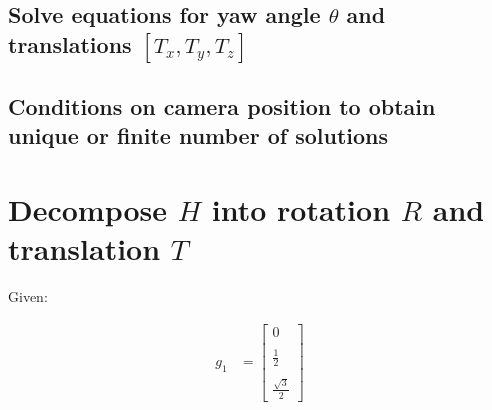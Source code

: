 \documentclass[12pt, oneside]{article}
\begin{document}
\subsection{Solve equations for yaw angle $\theta$ and translations 
$[T_x, T_y, T_z]$}

\subsection{Conditions on camera position to obtain unique or finite number 
of solutions}

\clearpage
\section{Decompose $H$ into rotation $R$ and translation $T$}

Given:

\begin{align*}
    g_1 &=  
    \begin{bmatrix} 0 \\ \\ \frac{1}{2} \\ \\ \frac{\sqrt{3}}{2} \end{bmatrix}
\end{align*}
    
\end{document}
